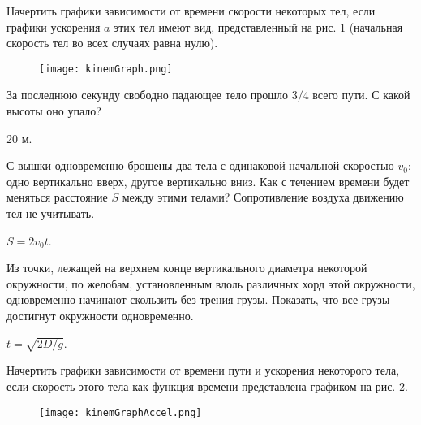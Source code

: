 \begin{ex} %
Начертить графики зависимости от времени скорости некоторых тел, если графики ускорения $a$ этих тел имеют вид, представленный на рис. \ref{kinemGraph} (начальная скорость тел во всех случаях равна нулю).
\begin{figure}
\centering
\texttt{[image: kinemGraph.png]}
\caption{}
\label{kinemGraph}
\end{figure}
\begin{ans}
\end{ans}
\end{ex}

\begin{ex} %
За последнюю секунду свободно падающее тело прошло $3/4$ всего пути. С какой высоты оно упало?
\begin{ans}
20 м.
\end{ans}
\end{ex}

\begin{ex} %
С вышки одновременно брошены два тела с одинаковой начальной скоростью $v_0$: одно вертикально вверх, другое вертикально вниз. Как с течением времени будет меняться расстояние $S$ между этими телами? Сопротивление воздуха движению тел не учитывать.
\begin{ans}
$S = 2 v_0 t$.
\end{ans}
\end{ex}

\begin{ex} %
Из точки, лежащей на верхнем конце вертикального диаметра некоторой окружности, по желобам, установленным вдоль различных хорд этой окружности, одновременно начинают скользить без трения грузы. Показать, что все грузы достигнут окружности одновременно.
\begin{ans}
$t = \sqrt{2D/g}$.
\end{ans}
\end{ex}

\begin{ex} %
Начертить графики зависимости от времени пути и ускорения некоторого тела, если скорость этого тела как функция времени представлена графиком на рис. \ref{kinemGraphAccel}.
\begin{figure}
\centering
\texttt{[image: kinemGraphAccel.png]}
\caption{}
\label{kinemGraphAccel}
\end{figure}
\begin{ans}
\end{ans}
\end{ex}

